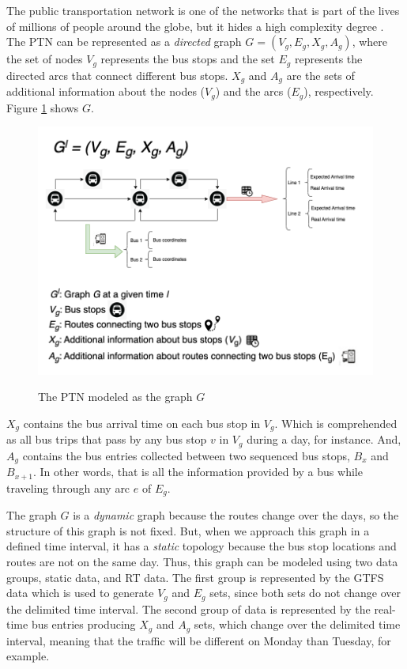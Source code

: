 The public transportation network is one of the networks that is 
part of the lives of millions of people around the globe, but it 
hides a high complexity degree \cite{ferber2012}.
The PTN can be represented as a {\em directed} graph $G=(V_g,E_g,X_g,A_g)$,
where the set of nodes $V_g$ represents the bus stops and
the set $E_g$ represents the directed arcs that connect different bus stops.
$X_g$ and $A_g$ are the sets of additional information about the nodes 
($V_g$) and the arcs ($E_g$), respectively. Figure \ref{img:2:2} shows $G$. 

    \begin{figure}[H]
     \centering
        \caption{The PTN modeled as the graph $G$}
        \includegraphics[scale=0.5]{imagem/cap2/final_graph.png}
        \label{img:2:2}
    \end{figure}

$X_g$ contains the bus arrival time on each bus stop in $V_g$. Which is
comprehended as all bus trips that pass by any bus stop $v$ in $V_g$
during a day, for instance. And,
$A_g$ contains the bus entries collected between two sequenced bus stops, $B_x$ and 
$B_{x+1}$. In other words, that is all the information provided by a bus while
traveling through any arc $e$ of $E_g$.


The graph $G$ is a {\em dynamic} graph because the routes change over the days, so the structure of this graph is not fixed.
But, when we approach this graph in a defined time interval, it has a {\em static} topology because the bus stop locations and routes
are not on the same day. Thus, this graph can be
modeled using two data groups, static data, and RT data.
The first group is represented by the GTFS data which is used to generate $V_g$ and
$E_g$ sets, since both sets do not change over the delimited time interval. The second group of data is represented by the real-time bus entries producing $X_g$ and $A_g$ sets, which change over the delimited time interval, meaning
that the traffic will be different on Monday than Tuesday, for example. 

